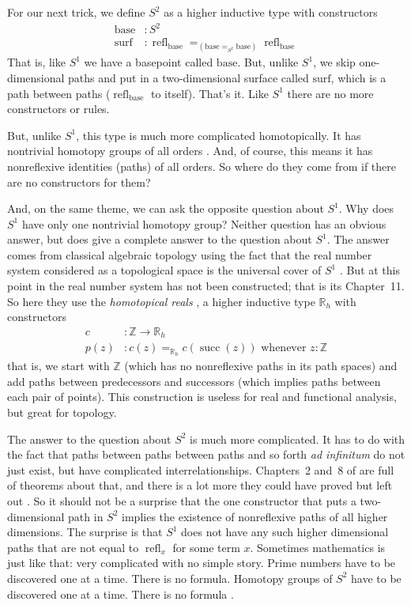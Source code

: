 \documentclass[11pt]{article}
\DeclareMathOperator{\refl}{refl}
\DeclareMathOperator{\successor}{succ}
\newcommand{\sbase}{\text{base}}
\newcommand{\ssurf}{\text{surf}}
\newcommand{\ints}{\mathbb{Z}}
\newcommand{\real}{\mathbb{R}}
\begin{document}
For our next trick, we define $S^2$ as a higher inductive type
with constructors
\begin{align*}
   \sbase & : S^2
   \\
   \ssurf & : \refl_\sbase =_{\left(\sbase =_{S^2} \sbase\right)} \refl_\sbase
\end{align*}
That is, like $S^1$ we have a basepoint called $\sbase$.
But, unlike $S^1$, we skip one-dimensional paths and put in a two-dimensional
surface called $\ssurf$, which is a path between paths ($\refl_\sbase$ to
itself).  That's it.  Like $S^1$ there are no more constructors or rules.

But, unlike $S^1$, this type is much more complicated homotopically.
It has nontrivial homotopy groups of all orders
.
And, of course, this means it has nonreflexive identities (paths) of all
orders.  So where do they come from if there are no constructors for them?

And, on the same theme, we can ask the opposite question about $S^1$.
Why does $S^1$ have only one nontrivial homotopy group?  Neither question
has an obvious answer, but  does give a complete
answer to the question about $S^1$.  The answer comes from classical
algebraic topology using the fact that the real number system considered
as a topological space is the universal cover of $S^1$
.  But at this point in
 the real number system has not been constructed;
that is its Chapter~11.  So here they use the \emph{homotopical reals}
, a higher inductive type $\real_h$ with
constructors
\begin{align*}
   c & : \ints \to \real_h
   \\
   p(z) & :
   \text{$c(z) =_{\real_h} c(\successor(z))$ whenever $z : \ints$}
\end{align*}
that is, we start with $\ints$ (which has no nonreflexive paths in its
path spaces)
and add paths between predecessors and successors
(which implies paths between each pair of points).
This construction is useless for real and functional analysis,
but great for topology.

The answer to the question about $S^2$ is much more complicated.
It has to do with the fact that paths between paths between paths
and so forth \emph{ad infinitum} do not just exist, but have complicated
interrelationships.  Chapters~2 and~8 of  are
full of theorems about that, and there is a lot more they could have
proved but left out .
So it should not be a surprise that the one constructor that puts
a two-dimensional path in $S^2$ implies the existence of nonreflexive
paths of all higher
dimensions.  The surprise is that $S^1$ does not have any such higher
dimensional paths that are not equal to $\refl_x$ for some term $x$.
Sometimes mathematics is just like that: very complicated with no simple
story.  Prime numbers have to be discovered one at a time.  There is no
formula.  Homotopy groups of $S^2$ have to be discovered one at a time.
There is no formula .
\end{document}
